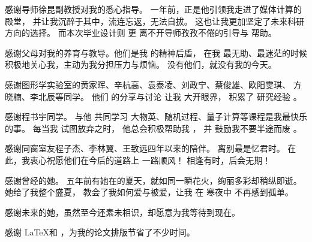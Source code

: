 \begin{acknowledgement}
	感谢导师徐昆副教授对我的悉心指导。
	一年前，正是他引领我走进了媒体计算的殿堂，
	并让我沉醉于其中，流连忘返，无法自拔。
	这也让我更加坚定了未来科研方向的选择。
	而本次毕业设计则%
	更%
	离不开导师孜孜不倦的引导与%
	帮助。

	感谢父母对我的养育与教导。他们是我%
	的精神后盾，
	在我%
	最无助、最迷茫的时候%
	积极地关心我，主动为我分担压力与烦恼。%
	没有他们，就没有我的今天。

	感谢图形学实验室的黄家晖、辛杭高、袁泰凌、刘政宁、蔡俊雄、欧阳雯琪、
	方晓楠、李北辰等同学。
	他们%
	的分享与讨论
	让我%
	大开眼界，%
	积累了
	研究经验%
	。



	感谢程书宇同学。
	与他     %
	共同学习 %
	大物英、随机过程、量子计算等课程是我最快乐的事。%
	每当我%
	试图放弃之时，%
	他总会积极帮助我%
	，%
	并
	鼓励我不要半途而废%
	。



	感谢同窗室友程子杰、李林翼、王致远四年以来的陪伴。
	离别最是忆君时。%
	在此，我衷心祝愿他们在今后的道路上
	一路顺风！
	相逢有时，后会无期！


	感谢曾经的她。
	五年前有她在的夏天，就如同一瞬花火，绚丽多彩却稍纵即逝。
	她给了我整个盛夏，%
	教会了我如何爱与被爱，让我
	在
	寒夜中
	不再感到孤单。


	感谢未来的她，虽然至今还素未相识，却愿意为我等待到现在。


	感谢 \LaTeX 和 \thuthesis，为我的论文排版节省了不少时间。


\end{acknowledgement}
